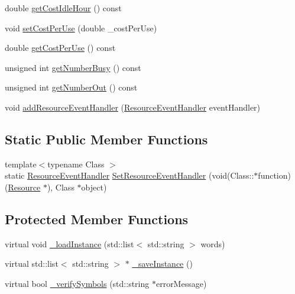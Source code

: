 \begin{DoxyCompactItemize}
\item 
double \hyperlink{class_resource_a8033fb963bed0116f01af2b637bd4cad}{get\+Cost\+Idle\+Hour} () const 
\item 
void \hyperlink{class_resource_adedf8ae8388efb1a194441613647b669}{set\+Cost\+Per\+Use} (double \+\_\+cost\+Per\+Use)
\item 
double \hyperlink{class_resource_a93d303fba82b1ef9879cc75fbafef506}{get\+Cost\+Per\+Use} () const 
\item 
unsigned int \hyperlink{class_resource_a6fafa0b8da75c9596ca52932482a5568}{get\+Number\+Busy} () const 
\item 
unsigned int \hyperlink{class_resource_a1aedd0bf239010a6b7e2a6c15a324481}{get\+Number\+Out} () const 
\item 
void \hyperlink{class_resource_afc3651546b83c8953306d7958c4ac179}{add\+Resource\+Event\+Handler} (\hyperlink{class_resource_a3a8c56cef21f639c17ccf95b8b6782e6}{Resource\+Event\+Handler} event\+Handler)
\end{DoxyCompactItemize}
\subsection*{Static Public Member Functions}
\begin{DoxyCompactItemize}
\item 
{\footnotesize template$<$typename Class $>$ }\\static \hyperlink{class_resource_a3a8c56cef21f639c17ccf95b8b6782e6}{Resource\+Event\+Handler} \hyperlink{class_resource_a1fba964737a4d0bfa505989a5b0c045f}{Set\+Resource\+Event\+Handler} (void(Class\+::$\ast$function)(\hyperlink{class_resource}{Resource} $\ast$), Class $\ast$object)
\end{DoxyCompactItemize}
\subsection*{Protected Member Functions}
\begin{DoxyCompactItemize}
\item 
virtual void \hyperlink{class_resource_a5c4aedea65e6800cf44fb3620d559148}{\+\_\+load\+Instance} (std\+::list$<$ std\+::string $>$ words)
\item 
virtual std\+::list$<$ std\+::string $>$ $\ast$ \hyperlink{class_resource_a546f61a6f5f57f0c41c722b9b9dc7478}{\+\_\+save\+Instance} ()
\item 
virtual bool \hyperlink{class_resource_a3b282a34c4c706ca63716cb74e7f8183}{\+\_\+verify\+Symbols} (std\+::string $\ast$error\+Message)
\end{DoxyCompactItemize}
